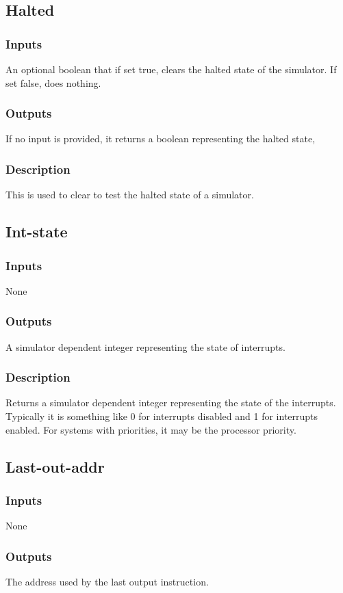 \documentclass[10pt, openany]{book}
\begin{document}
\subsection{Halted}
\subsubsection{Inputs}
An optional boolean that if set true, clears the halted state of the simulator.  If set false, does nothing.
\subsubsection{Outputs}
If no input is provided, it returns a boolean representing the halted state, 
\subsubsection{Description}
This is used to clear to test the halted state of a simulator.

\subsection{Int-state}
\subsubsection{Inputs}
None
\subsubsection{Outputs}
A simulator dependent integer representing the state of interrupts.
\subsubsection{Description}
Returns a simulator dependent integer representing the state of the interrupts.  Typically it is something like 0 for interrupts disabled and 1 for interrupts enabled.  For systems with priorities, it may be the processor priority.

\subsection{Last-out-addr}
\subsubsection{Inputs}
None
\subsubsection{Outputs}
The address used by the last output instruction.
\end{document}
